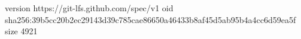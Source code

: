 version https://git-lfs.github.com/spec/v1
oid sha256:39b5cc20b2ec29143d39c785cae86650a46433b8af45d5ab95b4a4cc6d59ea5f
size 4921
